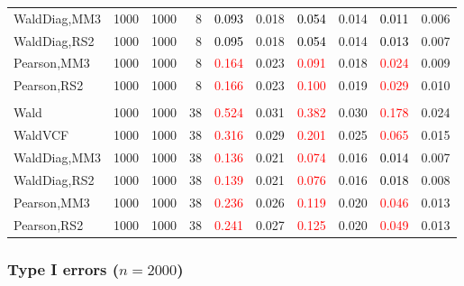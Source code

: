 \documentclass[
]{article}
\begin{document}
\begin{table}[H]
{\begin{tabular}[t]{lrrrrrrlrr}
\hspace{1em}WaldDiag,MM3 & 1000 & 1000 & 8 & \textcolor{black}{0.093} & 0.018 & \textcolor{black}{0.054} & 0.014 & \textcolor{black}{0.011} & 0.006\\
\hspace{1em}WaldDiag,RS2 & 1000 & 1000 & 8 & \textcolor{black}{0.095} & 0.018 & \textcolor{black}{0.054} & 0.014 & \textcolor{black}{0.013} & 0.007\\
\hspace{1em}Pearson,MM3 & 1000 & 1000 & 8 & \textcolor{red}{0.164} & 0.023 & \textcolor{red}{0.091} & 0.018 & \textcolor{red}{0.024} & 0.009\\
\hspace{1em}Pearson,RS2 & 1000 & 1000 & 8 & \textcolor{red}{0.166} & 0.023 & \textcolor{red}{0.100} & 0.019 & \textcolor{red}{0.029} & 0.010\\
\addlinespace[0.3em]
\multicolumn{10}{l}{\textbf{3F 15V}}\\
\hspace{1em}Wald & 1000 & 1000 & 38 & \textcolor{red}{0.524} & 0.031 & \textcolor{red}{0.382} & 0.030 & \textcolor{red}{0.178} & 0.024\\
\hspace{1em}WaldVCF & 1000 & 1000 & 38 & \textcolor{red}{0.316} & 0.029 & \textcolor{red}{0.201} & 0.025 & \textcolor{red}{0.065} & 0.015\\
\hspace{1em}WaldDiag,MM3 & 1000 & 1000 & 38 & \textcolor{red}{0.136} & 0.021 & \textcolor{red}{0.074} & 0.016 & \textcolor{black}{0.014} & 0.007\\
\hspace{1em}WaldDiag,RS2 & 1000 & 1000 & 38 & \textcolor{red}{0.139} & 0.021 & \textcolor{red}{0.076} & 0.016 & \textcolor{black}{0.018} & 0.008\\
\hspace{1em}Pearson,MM3 & 1000 & 1000 & 38 & \textcolor{red}{0.236} & 0.026 & \textcolor{red}{0.119} & 0.020 & \textcolor{red}{0.046} & 0.013\\
\hspace{1em}Pearson,RS2 & 1000 & 1000 & 38 & \textcolor{red}{0.241} & 0.027 & \textcolor{red}{0.125} & 0.020 & \textcolor{red}{0.049} & 0.013\\
\bottomrule
\end{tabular}}
\endgroup{}
\end{table}

\hypertarget{type-i-errors-n2000-1}{%
\subsubsection{\texorpdfstring{Type I errors
(\(n=2000\))}{Type I errors (n=2000)}}\label{type-i-errors-n2000-1}}
\end{document}
